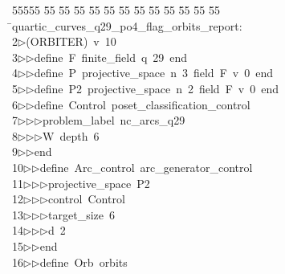 %
%
\begin{tabbing}
55555 \= 55 \= 55 \= 55 \= 55 \= 55 \= 55 \= 55 \= 55 \= 55 \= 55 \= 55 \= 55 \= \>quartic\_curves\_q29\_po4\_flag\_orbits\_report:\\[0pt]
2\>$\triangleright$\>(ORBITER)\ v\ 10\ \\[0pt]
3\>$\triangleright$\>$\triangleright$\>define\ F\ finite\_field\ q\ 29\ end\ \\[0pt]
4\>$\triangleright$\>$\triangleright$\>define\ P\ projective\_space\ n\ 3\ field\ F\ v\ 0\ end\ \\[0pt]
5\>$\triangleright$\>$\triangleright$\>define\ P2\ projective\_space\ n\ 2\ field\ F\ v\ 0\ end\ \\[0pt]
6\>$\triangleright$\>$\triangleright$\>define\ Control\ poset\_classification\_control\ \\[0pt]
7\>$\triangleright$\>$\triangleright$\>$\triangleright$\>problem\_label\ nc\_arcs\_q29\ \\[0pt]
8\>$\triangleright$\>$\triangleright$\>$\triangleright$\>W\ depth\ 6\ \\[0pt]
9\>$\triangleright$\>$\triangleright$\>end\ \\[0pt]
10\>$\triangleright$\>$\triangleright$\>define\ Arc\_control\ arc\_generator\_control\ \\[0pt]
11\>$\triangleright$\>$\triangleright$\>$\triangleright$\>projective\_space\ P2\ \\[0pt]
12\>$\triangleright$\>$\triangleright$\>$\triangleright$\>control\ Control\ \\[0pt]
13\>$\triangleright$\>$\triangleright$\>$\triangleright$\>target\_size\ 6\ \\[0pt]
14\>$\triangleright$\>$\triangleright$\>$\triangleright$\>d\ 2\ \\[0pt]
15\>$\triangleright$\>$\triangleright$\>end\ \\[0pt]
16\>$\triangleright$\>$\triangleright$\>define\ Orb\ orbits\ \\[0pt]

\end{tabbing}
